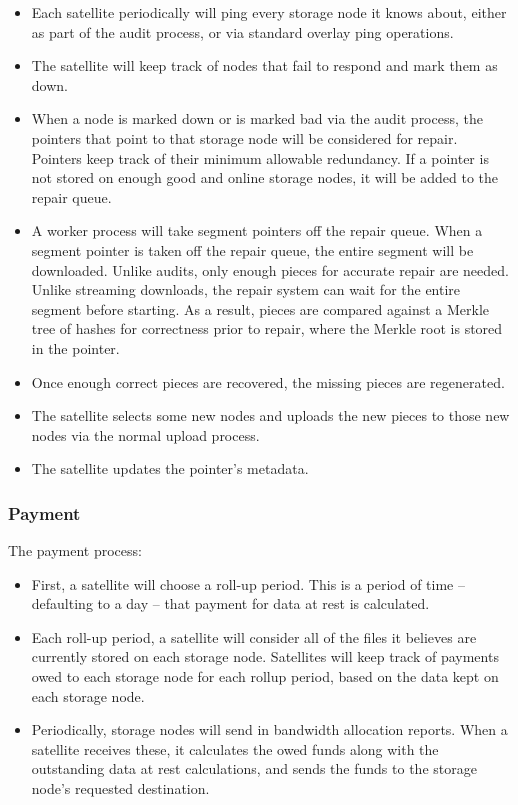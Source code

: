 \documentclass[a4paper,10pt]{article} \usepackage[utf8]{inputenc}
\begin{document}
\begin{itemize}
\item Each satellite periodically will ping every storage node it knows
about,
  either as part of the audit process, or via standard overlay ping operations.
\item The satellite will keep track of nodes that fail to respond and mark
  them as down.
\item When a node is marked down or is marked bad via the audit process, the
  pointers that point to that storage node will be considered for repair.
  Pointers
  keep track of their minimum allowable redundancy. If a pointer is not stored
  on enough good and online storage nodes, it will be added to the repair queue.
\item A worker process will take segment pointers off the repair queue. When
  a segment pointer is taken off the repair queue, the entire segment will be
  downloaded. Unlike audits, only enough pieces for accurate repair are needed.
  Unlike streaming downloads, the repair system can wait for the entire segment
  before starting. As a result, pieces are compared against a Merkle tree of
  hashes for correctness prior to repair, where the Merkle root is stored in
  the pointer.
\item Once enough correct pieces are recovered, the missing pieces are
  regenerated.
\item The satellite selects some new nodes and uploads the new pieces to
  those new nodes via the normal upload process.
\item The satellite updates the pointer's metadata.
\end{itemize}

\subsubsection{Payment}

The payment process:

\begin{itemize}
\item First, a satellite will choose a roll-up period. This is a period of
  time -- defaulting to a day -- that payment for data at rest is calculated.
\item Each roll-up period, a satellite will consider all of the files it
  believes are currently stored on each storage node. Satellites will keep track
of payments owed to each storage node for each rollup period, based on
the data kept on each storage node.
\item Periodically, storage nodes will send in bandwidth allocation reports.
When a
  satellite receives these, it calculates the owed funds along with the
  outstanding data at rest calculations, and sends the funds to the storage
  node's requested destination.
\end{itemize}
\end{document}
